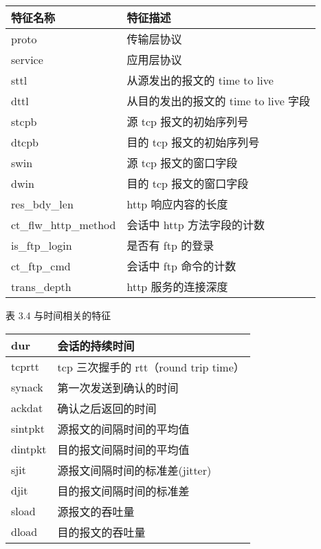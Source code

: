 \begin{table}[]
    \begin{tabular}{|l|l|}
    \hline
    特征名称                  & 特征描述                      \\ \hline
    proto                 & 传输层协议                     \\ \hline
    service               & 应用层协议                     \\ \hline
    sttl                  & 从源发出的报文的 time to live     \\ \hline
    dttl                  & 从目的发出的报文的 time to live 字段 \\ \hline
    stcpb                 & 源 tcp 报文的初始序列号            \\ \hline
    dtcpb                 & 目的 tcp 报文的初始序列号           \\ \hline
    swin                  & 源 tcp 报文的窗口字段             \\ \hline
    dwin                  & 目的 tcp 报文的窗口字段            \\ \hline
    res\_bdy\_len         & http 响应内容的长度              \\ \hline
    ct\_flw\_http\_method & 会话中 http 方法字段的计数          \\ \hline
    is\_ftp\_login        & 是否有 ftp 的登录               \\ \hline
    ct\_ftp\_cmd          & 会话中 ftp 命令的计数             \\ \hline
    trans\_depth          & http 服务的连接深度              \\ \hline
    \end{tabular}
    \end{table}

表 3.4  与时间相关的特征 
\begin{table}[]
    \begin{tabular}{|l|l|}
    \hline
    dur     & 会话的持续时间                        \\ \hline
    tcprtt  & tcp 三次握手的 rtt（round trip time） \\ \hline
    synack  & 第一次发送到确认的时间                    \\ \hline
    ackdat  & 确认之后返回的时间                      \\ \hline
    sintpkt & 源报文的间隔时间的平均值                   \\ \hline
    dintpkt & 目的报文间隔时间的平均值                   \\ \hline
    sjit    & 源报文间隔时间的标准差(jitter)            \\ \hline
    djit    & 目的报文间隔时间的标准差                   \\ \hline
    sload   & 源报文的吞吐量                        \\ \hline
    dload   & 目的报文的吞吐量                       \\ \hline
    \end{tabular}
    \end{table}

